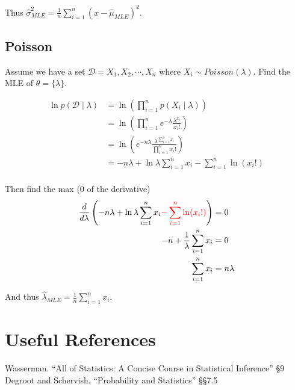 Thus $\displaystyle\hat\sigma^2_{MLE} = \frac{1}{n}\sum_{i=1}^n (x-\hat\mu_{MLE})^2$. 

\subsection{Poisson}
Assume we have a set $\mathcal{D} = X_1, X_2, \cdots, X_n$ 
where $X_i \sim Poisson(\lambda)$.
Find the MLE of $\theta = \{\lambda\}$.

\begin{align*}
\ln p(\mathcal{D}\mid\lambda) & = \ln\left(\prod_{i=1}^n p(X_i\mid\lambda)\right)\\
						& = \ln \left(\prod_{i=1}^n e^{-\lambda}\frac{\lambda^{x_i}}{x_i!}\right)\\
						& = \ln \left(e^{-n\lambda}\frac{\lambda^{\sum_{i=1}^n x_i}}{ \prod_{i=1}^nx_i!}\right)\\
						& = -n\lambda + \ln \lambda \sum_{i=1}^n x_i -\sum_{i=1}^n\ln(x_i!)\\
\end{align*}

Then find the max (0 of the derivative)
\begin{align*}
\frac{d}{d\lambda} \left( -n\lambda + \ln \lambda \sum_{i=1}^n x_i{\color{red} -\sum_{i=1}^n\ln(x_i!)}\right) &= 0\\
-n + \frac{1}{\lambda}\sum_{i=1}^n x_i & =0\\
\sum_{i=1}^n x_i & =n\lambda\\
\end{align*}

And thus $\displaystyle\hat\lambda_{MLE} = \frac{1}{n}\sum_{i=1}^n x_i$.

\section*{Useful References}
Wasserman. ``All of Statistics: A Concise Course in Statistical Inference'' \S9
Degroot and Schervish. ``Probability and Statistics''  \S\S7.5


